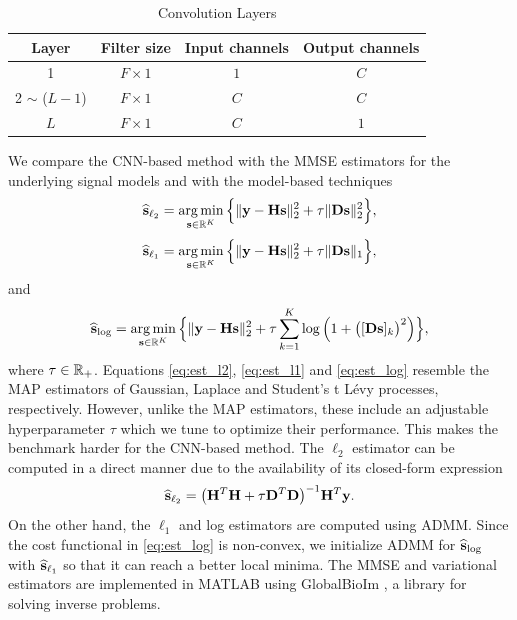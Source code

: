 \documentclass[journal]{IEEEtran}
\begin{document}
\begin{table}[t]
\caption{Convolution Layers}
\label{table:conv_layers}
\setlength{\tabcolsep}{3pt}
\renewcommand{\arraystretch}{1.5}
\centering
\begin{tabular}[c]{c| c | c | c}
\hline \hline
Layer  & Filter size & {Input channels} & Output channels  \\ \hline
1 & $F \times 1$ & $1$ & $C$ \\
2 $\sim$ ($L-1$) & $F \times 1$ & $C$ & $C$  \\
$L$ & $F \times 1$ & $C$ & $1$  \\ \hline \hline
\end{tabular}
\end{table}

We compare the CNN-based method with the MMSE estimators for the underlying signal models and with the model-based techniques
\begin{equation}\label{eq:est_l2}
    \widehat{{\bf{s}}}_{\ell_2} = \operatorname*{arg\,min}_{{\bf{s}} \in \mathbb{R}^K} \Big\{\|{\bf{y}} - {\bf{H}} {\bf{s}}\|_{2}^{2} + \tau \|{\bf{D}} {\bf{s}}\|_{2}^{2} \Big\},
\end{equation}
\begin{equation}\label{eq:est_l1}
    \widehat{{\bf{s}}}_{\ell_1} = \operatorname*{arg\,min}_{{\bf{s}} \in \mathbb{R}^K} \Big\{\|{\bf{y}} - {\bf{H}} {\bf{s}}\|_{2}^{2} + \tau \|{\bf{D}} {\bf{s}}\|_{1} \Big\},
\end{equation}
and
\begin{equation}\label{eq:est_log}
    \widehat{{\bf{s}}}_{\text{log}} = \operatorname*{arg\,min}_{{\bf{s}} \in \mathbb{R}^K} \Big\{\|{\bf{y}} - {\bf{H}} {\bf{s}}\|_{2}^{2} + \tau \sum_{k=1}^{K} \log \Big(1 + \big([{\bf{D}} {\bf{s}}]_k\big)^{2}\Big) \Big\},
\end{equation}
where $\tau \in \mathbb{R}_{+}$. Equations \eqref{eq:est_l2}, \eqref{eq:est_l1} and \eqref{eq:est_log} resemble the MAP estimators of Gaussian, Laplace and Student's t L\'{e}vy processes, respectively. However, unlike the MAP estimators, these include an adjustable hyperparameter $\tau$ which we tune to optimize their performance. This makes the benchmark harder for the CNN-based method. The $\ell_2$ estimator can be computed in a direct manner due to the availability of its closed-form expression
\begin{equation}
    \widehat{{\bf{s}}}_{\ell_2} = \big({\bf{H}}^{T} {\bf{H}} + \tau {\bf{D}}^{T} {\bf{D}} \big)^{-1} {\bf{H}}^{T} {\bf{y}}.
\end{equation}
On the other hand, the $\ell_1$ and log estimators are computed using ADMM. Since the cost functional in \eqref{eq:est_log} is non-convex, we initialize ADMM for $\widehat{{\bf{s}}}_{\text{log}}$ with $\widehat{{\bf{s}}}_{\ell_1}$ so that it can reach a better local minima. The MMSE and variational estimators are implemented in MATLAB using GlobalBioIm \cite{soubies2019pocket}, a library for solving inverse problems.
\end{document}
